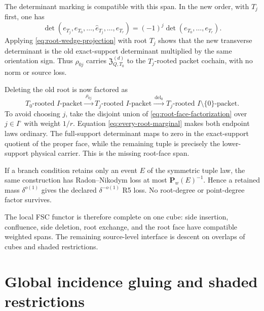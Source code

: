 \documentclass[11pt]{article}
\begin{document}
The determinant marking is compatible with this span.  In the new order,
with \(T_j\) first, one has
\begin{equation}\label{eq:reroot-determinant-sign}
 \det(e_{T_j},e_{T_0},\ldots,\widehat e_{T_j},\ldots,e_{T_r})
 =
 (-1)^j\det(e_{T_0},\ldots,e_{T_r}).
\end{equation}
Applying \eqref{eq:root-wedge-projection} with root \(T_j\) shows that the new
transverse determinant is the old exact-support determinant multiplied by
the same orientation sign.  Thus \(\rho_{0j}\) carries
\(\mathfrak Z^{(d)}_{Q,T_0}\) to the \(T_j\)-rooted packet cochain, with no norm
or source loss.

Deleting the old root is now factored as
\begin{equation}\label{eq:root-face-factorization}
 \text{\(T_0\)-rooted \(I\)-packet}
 \xrightarrow{\ \rho_{0j}\ }
 \text{\(T_j\)-rooted \(I\)-packet}
 \xrightarrow{\ \mathrm{del}_{0}\ }
 \text{\(T_j\)-rooted \(I\setminus\{0\}\)-packet}.
\end{equation}
To avoid choosing \(j\), take the disjoint union of
\eqref{eq:root-face-factorization} over \(j\in I^\circ\) with weight \(1/r\).
Equation \eqref{eq:every-root-marginal} makes both endpoint laws ordinary.
The full-support determinant maps to zero in the exact-support quotient of
the proper face, while the remaining tuple is precisely the lower-support
physical carrier.  This is the missing root-face span.

If a branch condition retains only an event \(E\) of the symmetric tuple law,
the same construction has Radon--Nikodym loss at most
\(\mathbf P_w(E)^{-1}\).  Hence a retained mass
\(\delta^{o(1)}\) gives the declared \(\delta^{-o(1)}\) R5 loss.  No
root-degree or point-degree factor survives.

The local FSC functor is therefore complete on one cube: side insertion,
confluence, side deletion, root exchange, and the root face have compatible
weighted spans.  The remaining source-level interface is descent on overlaps
of cubes and shaded restrictions.

\section{Global incidence gluing and shaded restrictions}
\end{document}
